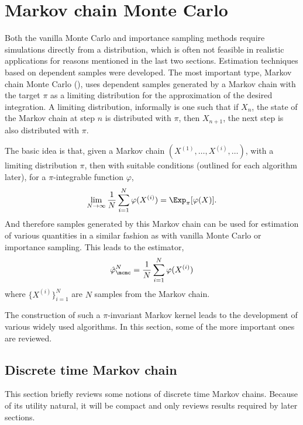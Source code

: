 \section{Markov chain Monte Carlo}
\label{sec:Markov chain Monte Carlo}

Both the vanilla Monte Carlo and importance sampling methods require
simulations directly from a distribution, which is often not feasible in
realistic applications for reasons mentioned in the last two sections.
Estimation techniques based on dependent samples were developed. The most
important type, Markov chain Monte Carlo (\mcmc), uses dependent samples
generated by a Markov chain with the target $\pi$ as a limiting distribution
for the approximation of the desired integration. A limiting distribution,
informally is one such that if $X_n$, the state of the Markov chain at step
$n$ is distributed with $\pi$, then $X_{n+1}$, the next step is also
distributed with $\pi$.

The basic idea is that, given a Markov chain $(X^{(1)},\dots,X^{(i)},\dots)$,
with a limiting distribution $\pi$, then with suitable conditions (outlined
for each algorithm later), for a $\pi$-integrable function $\varphi$,
\begin{equation}
  \lim_{N\to\infty}\frac{1}{N}\sum_{i=1}^N\varphi(X^{(i)}) =
  \Exp_{\pi}[\varphi(X)].
  \label{eq:mcmc convergence}
\end{equation}
And therefore samples generated by this Markov chain can be used for
estimation of various quantities in a similar fashion as with vanilla Monte
Carlo or importance sampling. This leads to the estimator,
\begin{equation}
  \hat\varphi_{\mcmc}^N = \frac{1}{N}\sum_{i=1}^N\varphi(X^{(i)})
  \label{eq:mcmc est}
\end{equation}
where $\{X^{(i)}\}_{i=1}^N$ are $N$ samples from the Markov chain.

The construction of such a $\pi$-invariant Markov kernel leads to the
development of various widely used \mcmc algorithms. In this section, some of
the more important ones are reviewed.

\subsection{Discrete time Markov chain}
\label{sub:Discrete time Markov chain}

This section briefly reviews some notions of discrete time Markov chains.
Because of its utility natural, it will be compact and only reviews results
required by later sections.

